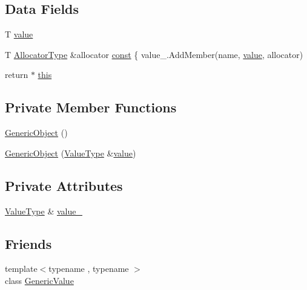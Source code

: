 \subsection*{Data Fields}
\begin{DoxyCompactItemize}
\item 
T \mbox{\hyperlink{classrapidjson_1_1_generic_object_afdba35584d4b33d5ab8c0c460f49c0a4}{value}}
\item 
T \mbox{\hyperlink{classrapidjson_1_1_generic_object_ae30003e248368737382eed69ec8fe1eb}{Allocator\+Type}} \&allocator \mbox{\hyperlink{classrapidjson_1_1_generic_object_a3524fcb5f36c034aabd8afa19fc16d9e}{const}} \{ value\+\_\+.\+Add\+Member(name, \mbox{\hyperlink{classrapidjson_1_1_generic_object_afdba35584d4b33d5ab8c0c460f49c0a4}{value}}, allocator)
\item 
return $\ast$ \mbox{\hyperlink{classrapidjson_1_1_generic_object_a16b86f62bb90bec993009f61b62a3210}{this}}
\end{DoxyCompactItemize}
\subsection*{Private Member Functions}
\begin{DoxyCompactItemize}
\item 
\mbox{\hyperlink{classrapidjson_1_1_generic_object_a71aeb6b731919dfe73aabb353b5a1d5c}{Generic\+Object}} ()
\item 
\mbox{\hyperlink{classrapidjson_1_1_generic_object_adf7b4532bb38b41ffb24f7663031b21a}{Generic\+Object}} (\mbox{\hyperlink{classrapidjson_1_1_generic_object_a282660500748eff5ebab93b88a9d478f}{Value\+Type}} \&\mbox{\hyperlink{classrapidjson_1_1_generic_object_afdba35584d4b33d5ab8c0c460f49c0a4}{value}})
\end{DoxyCompactItemize}
\subsection*{Private Attributes}
\begin{DoxyCompactItemize}
\item 
\mbox{\hyperlink{classrapidjson_1_1_generic_object_a282660500748eff5ebab93b88a9d478f}{Value\+Type}} \& \mbox{\hyperlink{classrapidjson_1_1_generic_object_a6e9b11ee1609f0e54119c974dbdc10af}{value\+\_\+}}
\end{DoxyCompactItemize}
\subsection*{Friends}
\begin{DoxyCompactItemize}
\item 
{\footnotesize template$<$typename , typename $>$ }\\class \mbox{\hyperlink{classrapidjson_1_1_generic_object_a899449e1a645b5e377af059fb61113d8}{Generic\+Value}}
\end{DoxyCompactItemize}


